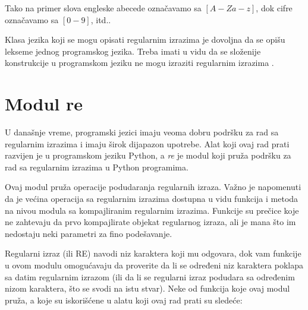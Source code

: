 \documentclass[12pt,oneside]{memoir}
\theoremstyle{plain}
\theoremstyle{definition}
\begin{document}
Tako na primer slova engleske abecede označavamo sa $[A-Za-z]$, dok cifre označavamo sa $[0-9]$, itd..

Klasa jezika koji se mogu opisati regularnim izrazima je dovoljna da se opišu lekseme jednog programskog jezika. Treba imati u vidu da se složenije konstrukcije u programskom jeziku ne mogu izraziti regularnim izrazima \cite{Vitas}. 

\section{Modul re}

U današnje vreme, programski jezici imaju veoma dobru podršku za rad sa regularnim izrazima i imaju širok dijapazon upotrebe. Alat koji ovaj rad prati razvijen je u programskom jeziku Python, a \textit{re} je modul koji pruža podršku za rad sa regularnim izrazima u Python programima.

Ovaj modul pruža operacije podudaranja regularnih izraza. Važno je napomenuti da je većina operacija sa regularnim izrazima dostupna u vidu funkcija i metoda na nivou modula sa kompajliranim regularnim izrazima. Funkcije su prečice koje ne zahtevaju da prvo kompajlirate objekat regularnog izraza, ali je mana što im nedostaju neki parametri za fino podešavanje. 

Regularni izraz (ili RE) navodi niz karaktera koji mu odgovara, dok vam funkcije u ovom modulu omogućavaju da proverite da li se određeni niz karaktera poklapa sa datim regularnim izrazom (ili da li se regularni izraz podudara sa određenim nizom karaktera, što se svodi na istu stvar).
Neke od funkcija koje ovaj modul pruža, a koje su iskorišćene u alatu koji ovaj rad prati su sledeće:
\end{document}
